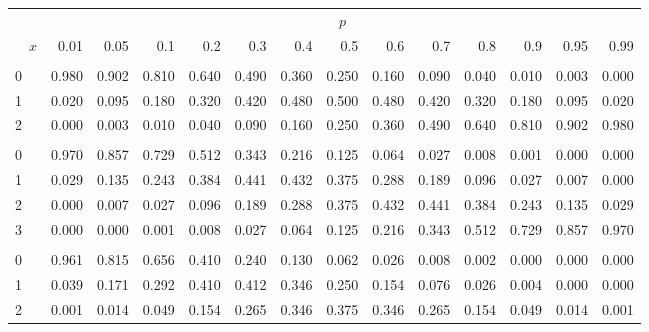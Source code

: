 \documentclass[
]{article}
\begin{document}
\begin{table}[H]
\centering
\begin{tabular}{lrrrrrrrrrrrrr}
\toprule
\multicolumn{1}{c}{ } & \multicolumn{13}{c}{$p$} \\
\cmidrule(l{3pt}r{3pt}){2-14}
$\hspace{1em}x$ & 0.01 & 0.05 & 0.1 & 0.2 & 0.3 & 0.4 & 0.5 & 0.6 & 0.7 & 0.8 & 0.9 & 0.95 & 0.99\\
\midrule
\addlinespace[0.3em]
\multicolumn{14}{l}{$n=2$}\\
\hspace{1em}0 & 0.980 & 0.902 & 0.810 & 0.640 & 0.490 & 0.360 & 0.250 & 0.160 & 0.090 & 0.040 & 0.010 & 0.003 & 0.000\\
\hspace{1em}1 & 0.020 & 0.095 & 0.180 & 0.320 & 0.420 & 0.480 & 0.500 & 0.480 & 0.420 & 0.320 & 0.180 & 0.095 & 0.020\\
\hspace{1em}2 & 0.000 & 0.003 & 0.010 & 0.040 & 0.090 & 0.160 & 0.250 & 0.360 & 0.490 & 0.640 & 0.810 & 0.902 & 0.980\\
\addlinespace[0.3em]
\multicolumn{14}{l}{$n=3$}\\
\hspace{1em}0 & 0.970 & 0.857 & 0.729 & 0.512 & 0.343 & 0.216 & 0.125 & 0.064 & 0.027 & 0.008 & 0.001 & 0.000 & 0.000\\
\hspace{1em}1 & 0.029 & 0.135 & 0.243 & 0.384 & 0.441 & 0.432 & 0.375 & 0.288 & 0.189 & 0.096 & 0.027 & 0.007 & 0.000\\
\hspace{1em}2 & 0.000 & 0.007 & 0.027 & 0.096 & 0.189 & 0.288 & 0.375 & 0.432 & 0.441 & 0.384 & 0.243 & 0.135 & 0.029\\
\hspace{1em}3 & 0.000 & 0.000 & 0.001 & 0.008 & 0.027 & 0.064 & 0.125 & 0.216 & 0.343 & 0.512 & 0.729 & 0.857 & 0.970\\
\addlinespace[0.3em]
\multicolumn{14}{l}{$n=4$}\\
\hspace{1em}0 & 0.961 & 0.815 & 0.656 & 0.410 & 0.240 & 0.130 & 0.062 & 0.026 & 0.008 & 0.002 & 0.000 & 0.000 & 0.000\\
\hspace{1em}1 & 0.039 & 0.171 & 0.292 & 0.410 & 0.412 & 0.346 & 0.250 & 0.154 & 0.076 & 0.026 & 0.004 & 0.000 & 0.000\\
\hspace{1em}2 & 0.001 & 0.014 & 0.049 & 0.154 & 0.265 & 0.346 & 0.375 & 0.346 & 0.265 & 0.154 & 0.049 & 0.014 & 0.001\\

\end{tabular}
\end{table}
\end{document}
